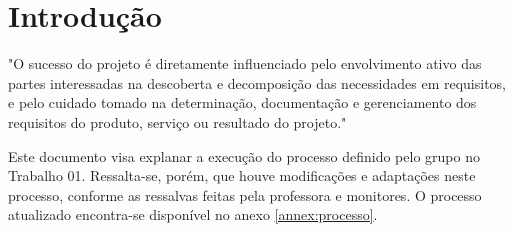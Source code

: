 \chapter*[Introdução]{Introdução}

"O sucesso do projeto é diretamente influenciado pelo envolvimento ativo das partes interessadas na
descoberta e decomposição das necessidades em requisitos, e pelo cuidado tomado na determinação,
documentação e gerenciamento dos requisitos do produto, serviço ou resultado do projeto." \cite{pmbok}

Este documento visa explanar a execução do processo definido pelo grupo no Trabalho 01. Ressalta-se,
porém, que houve modificações e adaptações neste processo, conforme as ressalvas feitas pela professora e monitores.
O processo atualizado encontra-se disponível no anexo \ref{annex:processo}.
